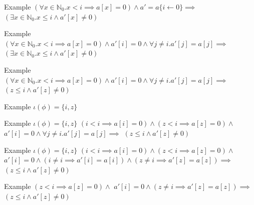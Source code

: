 \documentclass{beamer}
\begin{document}
\begin{frame}{Example}
$(\forall x \in \mathbb{N}_0. x < i \implies a[x] = 0) \wedge a' = a\{i\leftarrow 0\} \implies$\newline
$(\exists x \in \mathbb{N}_0. x \le i \wedge a'[x] \ne 0)$
\end{frame}

\begin{frame}{Example}
$(\forall x \in \mathbb{N}_0. x < i \implies a[x] = 0) \wedge a'[i] = 0 \wedge \forall j \ne i. a'[j] = a[j] \implies$\newline
$(\exists x \in \mathbb{N}_0. x \le i \wedge a'[x] \ne 0)$
\end{frame}

\begin{frame}{Example}
$(\forall x \in \mathbb{N}_0. x < i \implies a[x] = 0) \wedge a'[i] = 0 \wedge \forall j \ne i. a'[j] = a[j] \implies$\newline
$(z \le i \wedge a'[z] \ne 0)$
\end{frame}

\begin{frame}{Example}
$\iota(\phi) = \{i, z\}$
\end{frame}

\begin{frame}{Example}
$\iota(\phi) = \{i, z\}$\newline
$(i < i \implies a[i] = 0) \wedge (z < i \implies a[z] = 0) \wedge$\newline
$a'[i] = 0 \wedge \forall j \ne i. a'[j] = a[j] \implies$\newline
$(z \le i \wedge a'[z] \ne 0)$
\end{frame}

\begin{frame}{Example}
$\iota(\phi) = \{i, z\}$\newline
$(i < i \implies a[i] = 0) \wedge (z < i \implies a[z] = 0) \wedge$\newline
$a'[i] = 0 \wedge (i \ne i \implies a'[i] = a[i]) \wedge (z \ne i \implies a'[z] = a[z])\implies$\newline
$(z \le i \wedge a'[z] \ne 0)$
\end{frame}

\begin{frame}{Example}
$(z < i \implies a[z] = 0) \wedge$\newline
$a'[i] = 0 \wedge (z \ne i \implies a'[z] = a[z])\implies$\newline
$(z \le i \wedge a'[z] \ne 0)$
\end{frame}
\end{document}
